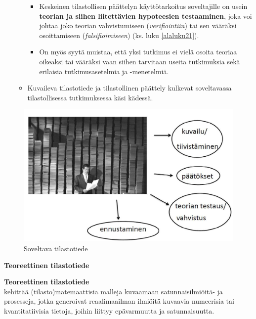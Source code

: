 \documentclass[
]{book}
\providecommand{\tightlist}{%
  \setlength{\itemsep}{0pt}\setlength{\parskip}{0pt}}
\begin{document}
\begin{itemize}
\begin{itemize}
    \begin{itemize}
    \tightlist
    \item
      Keskeinen tilastollisen päättelyn käyttötarkoitus soveltajille on usein \textbf{teorian ja siihen liitettävien hypoteesien testaaminen}, joka voi johtaa joko teorian vahvistumiseen (\emph{verifiointiin}) tai sen vääräksi osoittamiseen (\emph{falsifioimiseen}) (ks. luku \ref{alaluku21}).
    \item
      On myös syytä muistaa, että yksi tutkimus ei vielä osoita teoriaa oikeaksi tai vääräksi vaan siihen tarvitaan useita tutkimuksia sekä erilaisia tutkimusasetelmia ja -menetelmiä.
    \end{itemize}
  \item
    Kuvaileva tilastotiede ja tilastollinen päättely kulkevat soveltavassa tilastollisessa tutkimuksessa käsi kädessä.
  \end{itemize}
\end{itemize}

\begin{figure}

{\centering \includegraphics[width=1\linewidth]{images/soveltava} 

}

\caption{Soveltava tilastotiede}\label{fig:soveltava}
\end{figure}

\newpage

\textbf{Teoreettinen tilastotiede}

\begin{defblock}{}
\textbf{Teoreettinen tilastotiede}\\
kehittää (tilasto)matemaattisia malleja kuvaamaan satunnaisilmiöitä- ja prosesseja, jotka generoivat reaalimaailman ilmiöitä kuvaavia numeerisia tai kvantitatiivisia tietoja, joihin liittyy epävarmuutta ja satunnaisuutta.

\end{defblock}
\end{document}
